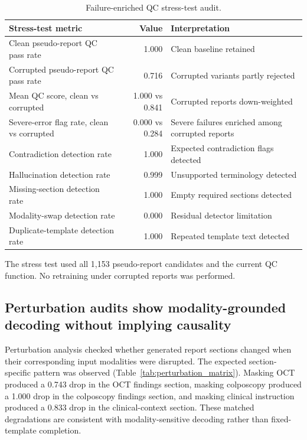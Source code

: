 \begin{table}[!htbp]
  \centering
  \caption{Failure-enriched QC stress-test audit.}
  \label{tab:qc_failure_stress_test}
  \small
  \begin{threeparttable}
  \begin{tabular}{lrl}
    \toprule
    \textbf{Stress-test metric} & \textbf{Value} & \textbf{Interpretation} \\
    \midrule
    Clean pseudo-report QC pass rate & 1.000 & Clean baseline retained \\
    Corrupted pseudo-report QC pass rate & 0.716 & Corrupted variants partly rejected \\
    Mean QC score, clean vs corrupted & 1.000 vs 0.841 & Corrupted reports down-weighted \\
    Severe-error flag rate, clean vs corrupted & 0.000 vs 0.284 & Severe failures enriched among corrupted reports \\
    Contradiction detection rate & 1.000 & Expected contradiction flags detected \\
    Hallucination detection rate & 0.999 & Unsupported terminology detected \\
    Missing-section detection rate & 1.000 & Empty required sections detected \\
    Modality-swap detection rate & 0.000 & Residual detector limitation \\
    Duplicate-template detection rate & 1.000 & Repeated template text detected \\
    \bottomrule
  \end{tabular}
  \begin{tablenotes}[flushleft]
    \footnotesize
    \item The stress test used all 1,153 pseudo-report candidates and the current QC function. No retraining under corrupted reports was performed.
  \end{tablenotes}
  \end{threeparttable}
\end{table}

\FloatBarrier

\subsection{Perturbation audits show modality-grounded decoding without implying causality}
\label{subsec:perturbation_results}

Perturbation analysis checked whether generated report sections changed when their corresponding input modalities were disrupted. The expected section-specific pattern was observed (Table~\ref{tab:perturbation_matrix}). Masking OCT produced a 0.743 drop in the OCT findings section, masking colposcopy produced a 1.000 drop in the colposcopy findings section, and masking clinical instruction produced a 0.833 drop in the clinical-context section. These matched degradations are consistent with modality-sensitive decoding rather than fixed-template completion.

